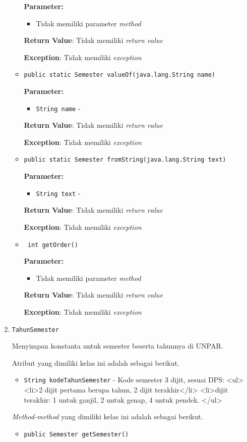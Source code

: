 \documentclass{article}
\begin{document}
\begin{enumerate}
\begin{itemize}
\textbf{Parameter:}
\begin{itemize}
\item Tidak memiliki parameter \textit{method}
\end{itemize}
\textbf{Return Value}: Tidak memiliki \textit{return value}

\textbf{Exception}: Tidak memiliki \textit{exception}

\item \texttt{public static Semester valueOf(java.lang.String name)}

\textbf{Parameter:}
\begin{itemize}
\item \texttt{String name} - 
\end{itemize}
\textbf{Return Value}: Tidak memiliki \textit{return value}

\textbf{Exception}: Tidak memiliki \textit{exception}

\item \texttt{public static Semester fromString(java.lang.String text)}

\textbf{Parameter:}
\begin{itemize}
\item \texttt{String text} - 
\end{itemize}
\textbf{Return Value}: Tidak memiliki \textit{return value}

\textbf{Exception}: Tidak memiliki \textit{exception}

\item \texttt{ int getOrder()}

\textbf{Parameter:}
\begin{itemize}
\item Tidak memiliki parameter \textit{method}
\end{itemize}
\textbf{Return Value}: Tidak memiliki \textit{return value}

\textbf{Exception}: Tidak memiliki \textit{exception}

\end{itemize}
\item \texttt{TahunSemester}

Menyimpan konstanta untuk semester beserta tahunnya di UNPAR.

Atribut yang dimiliki kelas ini adalah sebagai berikut.
\begin{itemize}
\item \texttt{String kodeTahunSemester} - Kode semester 3 dijit, sesuai DPS:
 <ul>
   <li>2 dijit pertama berupa tahun, 2 dijit terakhir</li>
   <li>dijit terakhir: 1 untuk ganjil, 2 untuk genap, 4 untuk pendek.
 </ul>
\end{itemize}
\textit{Method-method} yang dimiliki kelas ini adalah sebagai berikut.
\begin{itemize}
\item \texttt{public Semester getSemester()}


\end{itemize}
\end{enumerate}
\end{document}
